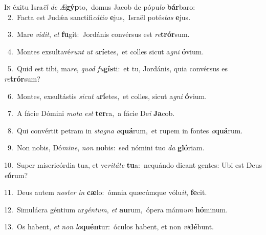 \lettrine{\initial\textcolor{\initialcolor}{I}}{n} éxitu Isra\textit{ël} \textit{de} \textit{Æ}\-\textbf{gýp}to,~\star domus Jacob de pópu\textit{lo} \textbf{bár}\-baro:\\
{\numbfont\textcolor{\numbcolor}{~2.}}~Facta est Judǽa sanctifi\-\textit{cá}\-\textit{ti}\textit{o} \textbf{e}\-jus,~\star Israël potés\textit{tas} \textbf{e}\-jus.\par
{\numbfont\textcolor{\numbcolor}{~3.}}~Mare \textit{vi}\-\textit{dit}, \textit{et} \textbf{fu}\-git:~\star Jordánis convérsus est \textit{re}\-\textbf{trór}sum.\par
{\numbfont\textcolor{\numbcolor}{~4.}}~Montes exsultavé\textit{runt} \textit{ut} \textit{a}\-\textbf{rí}etes,~\star et colles sicut a\textit{gni} \textbf{ó}\-vium.\par
{\numbfont\textcolor{\numbcolor}{~5.}}~Quid est tibi, ma\-\textit{re}\-, \textit{quod} \textit{fu}\-\textbf{gís}ti:~\star et tu, Jordánis, quia convérsus es \textit{re}\-\textbf{trór}sum?\par
{\numbfont\textcolor{\numbcolor}{~6.}}~Montes, exsultástis \textit{sic}\-\textit{ut} \textit{a}\-\textbf{rí}etes,~\star et colles, sicut a\textit{gni} \textbf{ó}\-vium.\par
{\numbfont\textcolor{\numbcolor}{~7.}}~A fácie Dómini \textit{mo}\-\textit{ta} \textit{est} \textbf{ter}\-ra,~\star a fácie De\textit{i} \textbf{Ja}\-cob.\par
{\numbfont\textcolor{\numbcolor}{~8.}}~Qui convértit petram in \textit{sta}\-\textit{gna} \textit{a}\-\textbf{quá}rum,~\star et rupem in fontes \textit{a}\-\textbf{quá}rum.\par
{\numbfont\textcolor{\numbcolor}{~9.}}~Non nobis, Dó\-\textit{mi}\-\textit{ne}, \textit{non} \textbf{no}\-bis:~\star sed nómini tuo \textit{da} \textbf{gló}\-riam.\par
{\numbfont\textcolor{\numbcolor}{10.}}~Super misericórdia tua, et ve\-\textit{ri}\-\textit{tá}\textit{te} \textbf{tu}\-a:~\star nequándo dicant gentes: Ubi est Deus \textit{e}\-\textbf{ó}rum?\par
{\numbfont\textcolor{\numbcolor}{11.}}~Deus autem \textit{nos}\-\textit{ter} \textit{in} \textbf{cæ}\-lo:~\star ómnia quæcúmque vólu\-\textit{it}\-, \textbf{fe}\-cit.\par
{\numbfont\textcolor{\numbcolor}{12.}}~Simulácra géntium ar\-\textit{gén}\-\textit{tum}, \textit{et} \textbf{au}\-rum,~\star ópera mánu\textit{um} \textbf{hó}\-minum.\par
{\numbfont\textcolor{\numbcolor}{13.}}~Os habent, \textit{et} \textit{non} \textit{lo}\-\textbf{quén}tur:~\star óculos habent, et non \textit{vi}\-\textbf{dé}bunt.\par
